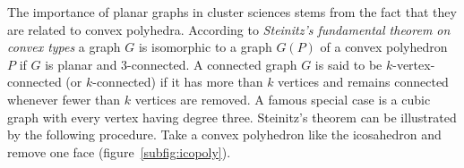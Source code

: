 The importance of planar graphs in cluster sciences stems from the fact that
they are related to convex polyhedra. According to \emph{Steinitz's fundamental
theorem on convex types} a graph $G$ is isomorphic to a graph $G(P)$ of a convex
polyhedron $P$ if $G$ is planar and 3-connected. A connected graph $G$ is said
to be $k$-vertex-connected (or $k$-connected) if it has more than $k$ vertices
and remains connected whenever fewer than $k$ vertices are removed. A famous
special case is a cubic graph with every vertex having degree three. Steinitz's
theorem can be illustrated by the following procedure. Take a convex polyhedron
like the icosahedron and remove one face (figure~\ref{subfig:icopoly}). 
%
\begin{figure}[htb]
    \centering
    \def \ico {1.618}
    \subfloat[\label{subfig:icopoly}]{
    \begin{tikzpicture}[tdplot_main_coords,
        every node/.style = {circle, fill = blue!20, inner sep = 0pt, minimum size = 0.5cm},
        rotate = 0,
        line join=bevel]


        \coordinate (1) at (0, 1, \ico);
        \coordinate (2) at (0, 1, -\ico);
        \coordinate (3) at (0, -1, \ico);
        \coordinate (4) at (0, -1, -\ico);
        \coordinate (5) at (1, \ico, 0);
        \coordinate (6) at (1, -\ico, 0);
        \coordinate (7) at (-1, \ico, 0);
        \coordinate (8) at (-1, -\ico, 0);
        \coordinate (9) at (\ico, 0, 1);
        \coordinate (10) at (\ico, 0, -1);
        \coordinate (11) at (-\ico, 0, 1);
        \coordinate (12) at (-\ico, 0, -1);

        


\end{tikzpicture}}
\end{figure}

